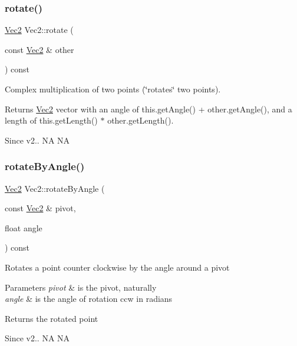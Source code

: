 \subsubsection{\texorpdfstring{rotate()}{rotate()}\hspace{0.1cm}{\footnotesize\ttfamily [4/4]}}
{\footnotesize\ttfamily \hyperlink{classVec2}{Vec2} Vec2\+::rotate (\begin{DoxyParamCaption}\item[{const \hyperlink{classVec2}{Vec2} \&}]{other }\end{DoxyParamCaption}) const\hspace{0.3cm}{\ttfamily [inline]}}

Complex multiplication of two points (\char`\"{}rotates\char`\"{} two points). \begin{DoxyReturn}{Returns}
\hyperlink{classVec2}{Vec2} vector with an angle of this.\+get\+Angle() + other.\+get\+Angle(), and a length of this.\+get\+Length() $\ast$ other.\+get\+Length(). 
\end{DoxyReturn}
\begin{DoxySince}{Since}
v2..  NA  NA 
\end{DoxySince}
\mbox{\label{classVec2_a1819c9ccc8f632bf0efbd36d0e890ce0}} 
\subsubsection{\texorpdfstring{rotate\+By\+Angle()}{rotateByAngle()}\hspace{0.1cm}{\footnotesize\ttfamily [1/2]}}
{\footnotesize\ttfamily \hyperlink{classVec2}{Vec2} Vec2\+::rotate\+By\+Angle (\begin{DoxyParamCaption}\item[{const \hyperlink{classVec2}{Vec2} \&}]{pivot,  }\item[{float}]{angle }\end{DoxyParamCaption}) const}

Rotates a point counter clockwise by the angle around a pivot 
\begin{DoxyParams}{Parameters}
{\em pivot} & is the pivot, naturally \\
\hline
{\em angle} & is the angle of rotation ccw in radians \\
\hline
\end{DoxyParams}
\begin{DoxyReturn}{Returns}
the rotated point 
\end{DoxyReturn}
\begin{DoxySince}{Since}
v2..  NA  NA 
\end{DoxySince}
\mbox{\label{classVec2_a1819c9ccc8f632bf0efbd36d0e890ce0}} 
